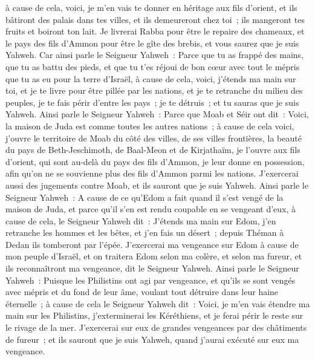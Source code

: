 \begin{multicols}{2}
à cause de cela, voici, je m'en vais te donner en héritage aux fils d'orient, et ils bâtiront des palais dans tes villes, et ils demeureront chez toi~; ils mangeront tes fruits et boiront ton lait.
Je livrerai Rabba pour être le repaire des chameaux, et le pays des fils d'Ammon pour être le gîte des brebis, et vous saurez que je suis Yahweh.
Car ainsi parle le Seigneur Yahweh~: Parce que tu as frappé des mains, que tu as battu des pieds, et que tu t'es réjoui de bon cœur avec tout le mépris que tu as eu pour la terre d'Israël,
à cause de cela, voici, j'étends ma main sur toi, et je te livre pour être pillée par les nations, et je te retranche du milieu des peuples, je te fais périr d'entre les pays~; je te détruis~; et tu sauras que je suis Yahweh.
Ainsi parle le Seigneur Yahweh~: Parce que Moab et Séir ont dit~: Voici, la maison de Juda est comme toutes les autres nations~;
à cause de cela voici, j'ouvre le territoire de Moab du côté des villes, de ses villes frontières, la beauté du pays de Beth-Jeschimoth, de Baal-Meon et de Kirjathaïm,
je l'ouvre aux fils d'orient, qui sont au-delà du pays des fils d'Ammon, je leur donne en possession, afin qu'on ne se souvienne plus des fils d'Ammon parmi les nations.
J'exercerai aussi des jugements contre Moab, et ils sauront que je suis Yahweh.
Ainsi parle le Seigneur Yahweh~: A cause de ce qu'Edom a fait quand il s'est vengé de la maison de Juda, et parce qu'il s'en est rendu coupable en se vengeant d'eux,
à cause de cela, le Seigneur Yahweh dit~: J'étends ma main sur Edom, j'en retranche les hommes et les bêtes, et j'en fais un désert~; depuis Théman à Dedan ils tomberont par l'épée.
J'exercerai ma vengeance sur Edom à cause de mon peuple d'Israël, et on traitera Edom selon ma colère, et selon ma fureur, et ils reconnaîtront ma vengeance, dit le Seigneur Yahweh.
Ainsi parle le Seigneur Yahweh~: Puisque les Philistins ont agi par vengeance, et qu'ils se sont vengés avec mépris et du fond de leur âme, voulant tout détruire dans leur haine éternelle~;
à cause de cela le Seigneur Yahweh dit~: Voici, je m'en vais étendre ma main sur les Philistins, j'exterminerai les Kéréthiens, et je ferai périr le reste sur le rivage de la mer.
J'exercerai sur eux de grandes vengeances par des châtiments de fureur~; et ils sauront que je suis Yahweh, quand j'aurai exécuté sur eux ma vengeance.

\end{multicols}
